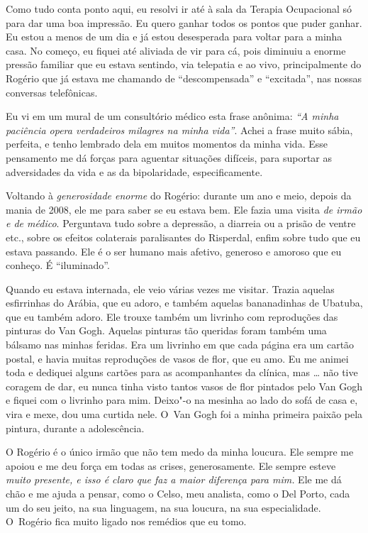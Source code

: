 Como tudo conta ponto aqui, eu resolvi ir até à sala da Terapia
Ocupacional só para dar uma boa impressão. Eu quero ganhar todos os
pontos que puder ganhar. Eu estou a menos de um dia e já estou
desesperada para voltar para a minha casa. No começo, eu fiquei até
aliviada de vir para cá, pois diminuiu a enorme pressão familiar que eu
estava sentindo, via telepatia e ao vivo, principalmente do Rogério que
já estava me chamando de ``descompensada'' e ``excitada'', nas nossas
conversas telefônicas.

Eu vi em um mural de um consultório médico esta frase anônima: \emph{``A
minha paciência opera verdadeiros milagres na minha vida''}. Achei a
frase muito sábia, perfeita, e tenho lembrado dela em muitos momentos da
minha vida. Esse pensamento me dá forças para aguentar situações
difíceis, para suportar as adversidades da vida e as da bipolaridade,
especificamente.

Voltando à \emph{generosidade enorme} do Rogério: durante um ano e meio,
depois da mania de 2008, ele me     para saber se
eu estava bem. Ele fazia uma visita \emph{de irmão e de médico}.
Perguntava tudo sobre a depressão, a diarreia ou a prisão de ventre
etc., sobre os efeitos colaterais paralisantes do Risperdal, enfim sobre
tudo que eu estava passando. Ele é o ser humano mais afetivo, generoso e
amoroso que eu conheço. É ``iluminado''.

Quando eu estava internada, ele veio várias vezes me visitar. Trazia
aquelas esfirrinhas do Arábia, que eu adoro, e também aquelas
bananadinhas de Ubatuba, que eu também adoro. Ele trouxe também um
livrinho com reproduções das pinturas do Van Gogh. Aquelas pinturas tão
queridas foram também uma bálsamo nas minhas feridas. Era um livrinho em
que cada página era um cartão postal, e havia muitas reproduções de
vasos de flor, que eu amo. Eu me animei toda e dediquei alguns cartões
para as acompanhantes da clínica, mas … não tive coragem de dar,
eu nunca tinha visto tantos vasos de flor pintados pelo Van Gogh e
fiquei com o livrinho para mim. Deixo"-o na mesinha ao lado do sofá de
casa e, vira e mexe, dou uma curtida nele. O~Van Gogh foi a minha
primeira paixão pela pintura, durante a adolescência.

O Rogério é o único irmão que não tem medo da minha loucura. Ele sempre
me apoiou e me deu força em todas as crises, generosamente. Ele sempre
esteve \emph{muito presente, e isso é claro que faz a maior diferença
para mim.} Ele me dá chão e me ajuda a pensar, como o Celso, meu
analista, como o Del Porto, cada um do seu jeito, na sua linguagem, na
sua loucura, na sua especialidade. O~Rogério fica muito ligado nos
remédios que eu tomo.

